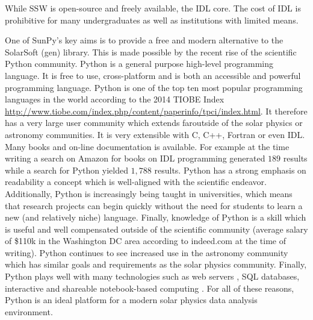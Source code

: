 
While SSW is open-source and freely available, the IDL core. The cost 
of IDL is prohibitive for many undergraduates as well as institutions 
with limited means. 

One of SunPy's key aims is to provide a free and modern alternative 
to the SolarSoft (gen) library. This is made possible by the recent 
rise of the scientific Python community. Python is a general purpose 
high-level programming language. It is free to use, cross-platform 
and is both an accessible and powerful programming language. Python 
is one of the top ten most popular programming languages in the world 
according to the 2014 TIOBE Index 
\url{http://www.tiobe.com/index.php/content/paperinfo/tpci/index.html}.
It therefore has a very large user community which extends faroutside 
of the solar physics or astronomy communities. It is very extensible 
with C, C++, Fortran or even IDL. Many books and on-line 
documentation is available. For example at the time writing a search 
on Amazon for books on IDL programming generated $189$ results while 
a search for Python yielded $1,788$ results. Python has a strong 
emphasis on readability a concept which is well-aligned with the 
scientific endeavor.
Additionally, Python is increasingly being taught in universities,
which means that research projects can begin quickly 
without the need for students to learn a new (and relatively niche) 
language. Finally, knowledge of Python is a skill which is useful and well 
compensated outside of the scientific community (average salary of 
\$110k in the Washington DC area according to indeed.com at the time 
of writing). Python continues to see increased use in the astronomy 
community \cite{greenfield2011} which has similar goals and 
requirements as the solar physics community. Finally, Python plays 
well with many technologies such as web servers \cite{dolgert2008}, 
SQL databases, interactive and shareable notebook-based computing 
\cite{perez2007}. For all of these reasons, Python is an ideal 
platform for a modern solar physics data analysis environment.

